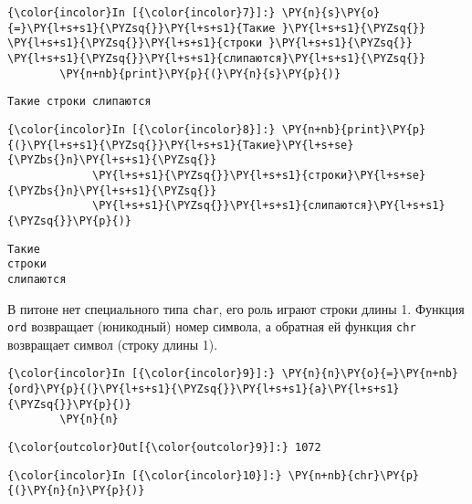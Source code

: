     \begin{Verbatim}[commandchars=\\\{\}]
{\color{incolor}In [{\color{incolor}7}]:} \PY{n}{s}\PY{o}{=}\PY{l+s+s1}{\PYZsq{}}\PY{l+s+s1}{Такие }\PY{l+s+s1}{\PYZsq{}} \PY{l+s+s1}{\PYZsq{}}\PY{l+s+s1}{строки }\PY{l+s+s1}{\PYZsq{}} \PY{l+s+s1}{\PYZsq{}}\PY{l+s+s1}{слипаются}\PY{l+s+s1}{\PYZsq{}}
        \PY{n+nb}{print}\PY{p}{(}\PY{n}{s}\PY{p}{)}
\end{Verbatim}

    \begin{Verbatim}[commandchars=\\\{\}]
Такие строки слипаются

    \end{Verbatim}

    \begin{Verbatim}[commandchars=\\\{\}]
{\color{incolor}In [{\color{incolor}8}]:} \PY{n+nb}{print}\PY{p}{(}\PY{l+s+s1}{\PYZsq{}}\PY{l+s+s1}{Такие}\PY{l+s+se}{\PYZbs{}n}\PY{l+s+s1}{\PYZsq{}}
             \PY{l+s+s1}{\PYZsq{}}\PY{l+s+s1}{строки}\PY{l+s+se}{\PYZbs{}n}\PY{l+s+s1}{\PYZsq{}}
             \PY{l+s+s1}{\PYZsq{}}\PY{l+s+s1}{слипаются}\PY{l+s+s1}{\PYZsq{}}\PY{p}{)}
\end{Verbatim}

    \begin{Verbatim}[commandchars=\\\{\}]
Такие
строки
слипаются

    \end{Verbatim}

    В питоне нет специального типа \texttt{char}, его роль играют строки
длины 1. Функция \texttt{ord} возвращает (юникодный) номер символа, а
обратная ей функция \texttt{chr} возвращает символ (строку длины 1).

    \begin{Verbatim}[commandchars=\\\{\}]
{\color{incolor}In [{\color{incolor}9}]:} \PY{n}{n}\PY{o}{=}\PY{n+nb}{ord}\PY{p}{(}\PY{l+s+s1}{\PYZsq{}}\PY{l+s+s1}{а}\PY{l+s+s1}{\PYZsq{}}\PY{p}{)}
        \PY{n}{n}
\end{Verbatim}

            \begin{Verbatim}[commandchars=\\\{\}]
{\color{outcolor}Out[{\color{outcolor}9}]:} 1072
\end{Verbatim}
        
    \begin{Verbatim}[commandchars=\\\{\}]
{\color{incolor}In [{\color{incolor}10}]:} \PY{n+nb}{chr}\PY{p}{(}\PY{n}{n}\PY{p}{)}
\end{Verbatim}

